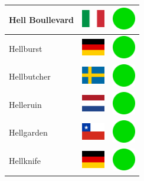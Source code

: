 \documentclass[12pt, a4paper, twoside]{report}
\begin{document}
\begin{center}
\begin{longtable}{|p{5cm}|p{2cm}|p{2cm}|}
 Hell Boullevard                                            & \includegraphics[width=1cm]{../img/flags/it} &   \includegraphics[width=1cm]{../likes/y} \\ \hline
 Hellburst                                                  & \includegraphics[width=1cm]{../img/flags/de} &   \includegraphics[width=1cm]{../likes/y} \\ \hline
 Hellbutcher                                                & \includegraphics[width=1cm]{../img/flags/se} &   \includegraphics[width=1cm]{../likes/y} \\ \hline
 Helleruin                                                  & \includegraphics[width=1cm]{../img/flags/nl} &   \includegraphics[width=1cm]{../likes/y} \\ \hline
 Hellgarden                                                 & \includegraphics[width=1cm]{../img/flags/cl} &   \includegraphics[width=1cm]{../likes/y} \\ \hline
 Hellknife                                                  & \includegraphics[width=1cm]{../img/flags/de} &   \includegraphics[width=1cm]{../likes/y} \\ \hline

\end{longtable}
\end{center}
\end{document}
